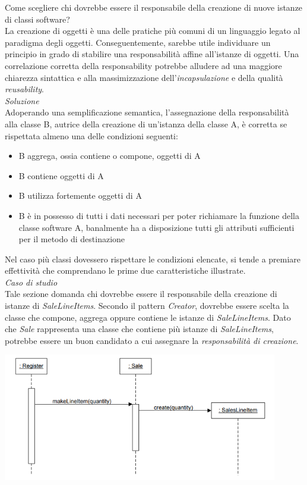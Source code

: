 \documentclass{article}
\begin{document}
Come scegliere chi dovrebbe essere il responsabile della creazione di nuove istanze di classi software?\vspace*{7pt}\\
La creazione di oggetti è una delle pratiche più comuni di un linguaggio legato al paradigma degli oggetti. Conseguentemente, sarebbe utile individuare un principio in grado di stabilire una responsabilità affine all'istanze di oggetti. Una correlazione corretta della responsability potrebbe alludere ad una maggiore chiarezza sintattica e alla massimizzazione dell'\textit{incapsulazione} e della qualità \textit{reusability}.\vspace*{14pt}\\
\textit{Soluzione}\\
Adoperando una semplificazione semantica, l'assegnazione della responsabilità alla classe B, autrice della creazione di un'istanza della classe A, è corretta se rispettata almeno una delle condizioni seguenti:
\begin{itemize}[label={-}]
    \itemsep0em
    \item B aggrega, ossia contiene o compone, oggetti di A 
    \item B contiene oggetti di A 
    \item B utilizza fortemente oggetti di A
    \item B è in possesso di tutti i dati necessari per poter richiamare la funzione della classe software A, banalmente ha a disposizione tutti gli attributi sufficienti per il metodo di destinazione
\end{itemize}
Nel caso più classi dovessero rispettare le condizioni elencate, si tende a premiare effettività che comprendano le prime due caratteristiche illustrate.\vspace*{14pt}\\
\textit{Caso di studio}\\
Tale sezione domanda chi dovrebbe essere il responsabile della creazione di istanze di \textit{SaleLineItems}. Secondo il pattern \textit{Creator}, dovrebbe essere scelta la classe che compone, aggrega oppure contiene le istanze di \textit{SaleLineItems}. Dato che \textit{Sale} rappresenta una classe che contiene più istanze di \textit{SaleLineItems}, potrebbe essere un buon candidato a cui assegnare la \textit{responsabilità di creazione}.\vspace*{7pt}
\begin{center}
    \includegraphics[width=0.9\textwidth]{foto 2.png}
\end{center} 
\end{document}

